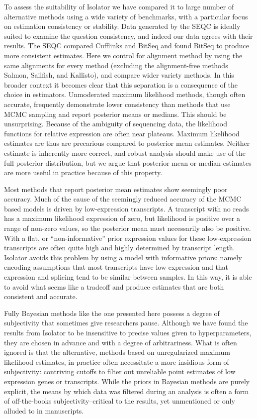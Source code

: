 \documentclass[twocolumn]{article}
\begin{document}
To assess the suitability of Isolator we have compared it to large number of
alternative methods using a wide variety of benchmarks, with a particular focus
on estimation consistency or stability. Data generated by the SEQC is ideally
suited to examine the question consistency, and indeed our data agrees with
their results. The SEQC compared Cufflinks and BitSeq and found BitSeq to
produce more consistent estimates. Here we control for alignment method by using
the same alignments for every method (excluding the alignment-free methods
Salmon, Sailfish, and Kallisto), and compare wider variety methods. In this
broader context it becomes clear that this separation is a consequence of the
choice in estimators. Unmoderated maximum likelihood methods, though often
accurate, frequently demonstrate lower consistency than methods that use MCMC
sampling and report posterior means or medians. This should be unsurprising.
Because of the ambiguity of sequencing data, the likelihood functions for
relative expression are often near plateaus. Maximum likelihood estimates are
thus are precarious compared to posterior mean estimates. Neither estimate is
inherently more correct, and robust analysis should make use of the full
posterior distribution, but we argue that posterior mean or median estimates
are more useful in practice because of this property.

Most methods that report posterior mean estimates show seemingly poor accuracy.
Much of the cause of the seemingly reduced accuracy of the MCMC based models is
driven by low-expression transcripts. A transcript with no reads has a maximum
likelihood expression of zero, but likelihood is positive over a range of
non-zero values, so the posterior mean must necessarily also be positive. With
a flat, or ``non-informative'' prior expression values for these low-expression
transcripts are often quite high and highly determined by transcript length.
Isolator avoids this problem by using a model with informative priors: namely
encoding assumptions that most transcripts have low expression and that
expression and splicing tend to be similar between samples. In this way, it is
able to avoid what seems like a tradeoff and produce estimates that are both
consistent and
accurate.

Fully Bayesian methods like the one presented here possess a degree of
subjectivity that sometimes give researchers pause. Although we have
found the results from Isolator to be insensitive to precise values
given to hyperparameters, they are chosen in advance and with a degree
of arbitrariness. What is often ignored is that the alternative, methods
based on unregularized maximum likelihood estimates, in practice often
necessitate a more insidious form of subjectivity: contriving cutoffs to
filter out unreliable point estimates of low expression genes or
transcripts. While the priors in Bayesian methods are purely explicit,
the means by which data was filtered during an analysis is often a form
of off-the-books subjectivity--critical to the results, yet unmentioned
or only alluded to in manuscripts.
\end{document}
